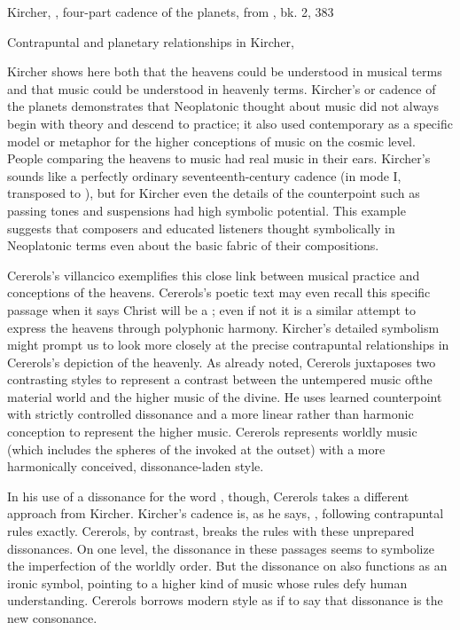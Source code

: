 {Kircher, ,
four-part cadence of the planets, from , bk. 2,
383}

{Contrapuntal and planetary relationships in Kircher, }

Kircher shows here both that the heavens could be understood in musical terms
and that music could be understood in heavenly terms.
Kircher's  or cadence of the planets demonstrates that
Neoplatonic thought about music did not always begin with theory and descend to
practice; it also used contemporary  as a specific
model or metaphor for the higher conceptions of music on the cosmic level. 
People comparing the heavens to music had real music in their ears.
Kircher's  sounds like a perfectly ordinary seventeenth-century
cadence (in mode I, transposed to ), but for Kircher even
the  details of the counterpoint such as passing tones and
suspensions had high symbolic potential.
This example suggests that composers and educated listeners thought symbolically
in Neoplatonic terms even about the basic fabric of their compositions.

Cererols's villancico exemplifies this close link between musical practice and
conceptions of the heavens.
Cererols's poetic text may even recall this specific passage when it says Christ
will be a ; even if not it is a similar attempt to
express the heavens through polyphonic harmony.
Kircher's detailed symbolism might prompt us to look more closely at the precise
contrapuntal relationships in Cererols's depiction of the heavenly.
As already noted, Cererols juxtaposes two contrasting styles to represent a
contrast between the untempered music ofthe material world and the higher music
of the divine.
He uses learned counterpoint with strictly controlled dissonance and a more
linear rather than harmonic conception to represent the higher music. 
Cererols represents worldly music (which includes the spheres of the
 invoked at the outset) with a more harmonically conceived,
dissonance-laden style.

In his use of a dissonance for the word , though, Cererols
takes a different approach from Kircher.
Kircher's cadence is, as he says, , following
contrapuntal rules exactly.
Cererols, by contrast, breaks the rules with these unprepared dissonances.
On one level, the dissonance in these passages seems to symbolize the
imperfection of the worldly order.
But the dissonance on  also functions as an
ironic symbol, pointing to a higher kind of music whose rules defy human
understanding.
Cererols borrows modern style as if to say that dissonance is the new
consonance.

